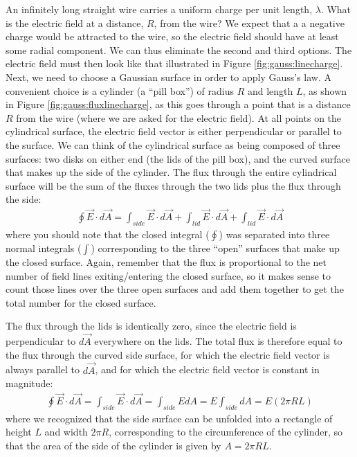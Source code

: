 \begin{example}{An infinitely long straight wire carries a uniform charge per unit length, $\lambda$. What is the electric field at a distance, $R$, from the wire?}
We expect that a a negative charge would be attracted to the wire, so the electric field should have at least some radial component. We can thus eliminate the second and third options. The electric field must then look like that illustrated in Figure \ref{fig:gauss:linecharge}.
Next, we need to choose a Gaussian surface in order to apply Gauss's law. A convenient choice is a cylinder (a ``pill box'') of radius $R$ and length $L$, as shown in Figure \ref{fig:gauss:fluxlinecharge}, as this goes through a point that is a distance $R$ from the wire (where we are asked for the electric field). At all points on the cylindrical surface, the electric field vector is either perpendicular or parallel to the surface.
We can think of the cylindrical surface as being composed of three surfaces: two disks on either end (the lids of the pill box), and the curved surface that makes up the side of the cylinder. The flux through the entire cylindrical surface will be the sum of the fluxes through the two lids plus the flux through the side:
\begin{align*}
\oint \vec E\cdot d\vec A = \int_{side} \vec E\cdot d\vec A + \int_{lid}\vec E\cdot d\vec A + \int_{lid}\vec E\cdot d\vec A
\end{align*}
where you should note that the closed integral ($\oint$) was separated into three normal integrals ($\int$) corresponding to the three ``open'' surfaces that make up the closed surface. Again, remember that the flux is proportional to the net number of field lines exiting/entering the closed surface, so it makes sense to count those lines over the three open surfaces and add them together to get the total number for the closed surface.

The flux through the lids is identically zero, since the electric field is perpendicular to $d\vec A$ everywhere on the lids. The total flux is therefore equal to the flux through the curved side surface, for which the electric field vector is always parallel to $d\vec A$, and for which the electric field vector is constant in magnitude:
\begin{align*}
\oint \vec E\cdot d\vec A = \int_{side} \vec E\cdot d\vec A =\int_{side} EdA=E\int_{side}dA=E(2\pi R L)
\end{align*}
where we recognized that the side surface can be unfolded into a rectangle of height $L$ and width $2\pi R$, corresponding to the circumference of the cylinder, so that the area of the side of the cylinder is given by $A=2\pi R L$. 


\end{example}
